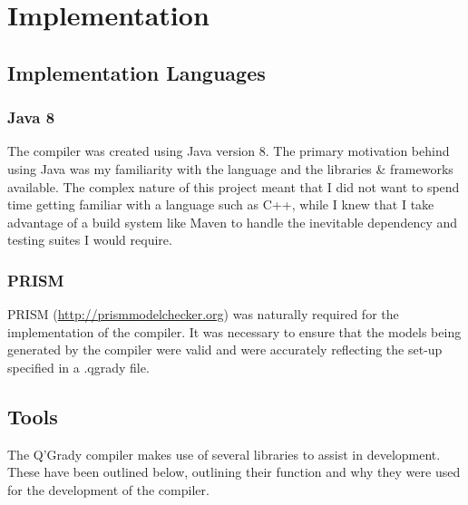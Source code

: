 \documentclass[report.tex]{subfiles}
\begin{document}
\chapter{Implementation} %
\label{cha:implementation}


\section{Implementation Languages} %
\label{sec:implementation_languages}

\subsection{Java 8} %
\label{sub:java_8}
The compiler was created using Java version 8. The primary motivation behind
using Java was my familiarity with the language and the libraries \& frameworks
available. The complex nature of this project meant that I did not want to spend
time getting familiar with a language such as C++, while I knew that I take
advantage of a build system like Maven to handle the inevitable dependency and
testing suites I would require.

\subsection{PRISM} %
\label{sub:prism}
PRISM (\url{http://prismmodelchecker.org}) was naturally required for the
implementation of the compiler. It was necessary to ensure that the models being
generated by the compiler were valid and were accurately reflecting the set-up
specified in a .qgrady file.


\section{Tools} %
\label{sec:tools}
The Q'Grady compiler makes use of several libraries to assist in development.
These have been outlined below, outlining their function and why they were used
for the development of the compiler.
\end{document}
